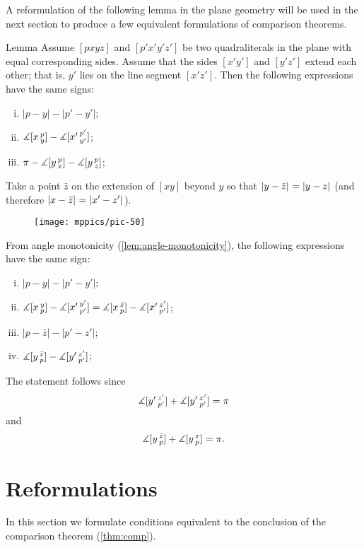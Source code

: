 A reformulation of the following lemma in the plane geometry will be used in the next section to produce a few equivalent formulations of comparison theorems.

\begin{thm}{Lemma}
\label{lem:alex}
Assume $[pxyz]$ and $[p'x'y'z']$ be two quadraliterals in the plane with equal corresponding sides.
Assume that the sides $[x'y']$ and $[y'z']$ extend each other; that is, $y'$ lies on the line segment $[x'z']$.
Then the following expressions have the same signs:
\begin{enumerate}[(i)]
 \item $|p-y|-|p'-y'|$;
 \item $\measuredangle[x\,{}^{p}_{y}]-\measuredangle[x'\,{}^{p'}_{y'}]$;
 \item $\pi-\measuredangle[y\,{}^{p}_{x}]-\measuredangle[y\,{}^{p}_{z}]$;
\end{enumerate}
\end{thm}

Take 
a point $\bar z$ on the extension of 
$[xy]$ beyond $y$ so that $\dist{y}{\bar z}{}=\dist{y}{z}{}$ (and therefore $\dist{x}{\bar z}{}=\dist{x'}{z'}{}$). 
 
\begin{figure}[h!]
\vskip-0mm
\centering
\texttt{[image: mppics/pic-50]}
\vskip-0mm
\end{figure}

From angle monotonicity (\ref{lem:angle-monotonicity}), 
the following expressions have the same sign:
\begin{enumerate}[(i)]
\item $|p-y|-|p'-y'|$;
\item $\measuredangle[x\,{}^{y}_{p}]-\measuredangle[x'\,{}^{y'}_{p'}]=\measuredangle[x\,{}^{\bar z}_{p}]-\measuredangle[x'\,{}^{z'}_{p'}]$;
\item $|p-\bar z|-|p'-z'|$;
\item $\measuredangle[y\,{}^{\bar z}_{p}]-\measuredangle[y'\,{}^{z'}_{p'}]$;
\end{enumerate}
The statement follows since
\[\measuredangle[y'\,{}^{z'}_{p'}]+\measuredangle[y'\,{}^{x'}_{p'}]=\pi\]
and
\[\measuredangle[y\,{}^{\bar z}_{p}]+\measuredangle[y\,{}^{x}_{p}]=\pi.\]
\qedsf

\section{Reformulations}

In this section we formulate conditions equivalent to the conclusion of the comparison theorem (\ref{thm:comp}).

